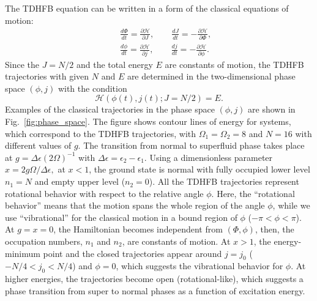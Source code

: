 \documentclass[%
superscriptaddress,
preprint,
showpacs,
nofootinbib,
amsmath,amssymb,
aps,
prc,
floatfix ]%
{revtex4-1}
\begin{document}
The TDHFB equation can be written in a form of
the classical equations of motion:
\begin{eqnarray}
	&&\frac{d\Phi}{dt} = \frac{\partial\mathcal{H}}{\partial J} ,\quad\quad
\frac{dJ}{dt} = -\frac{\partial\mathcal{H}}{\partial \Phi} , \\
	&&\frac{d\phi}{dt} = \frac{\partial\mathcal{H}}{\partial j} ,\quad\quad
\frac{dj}{dt} = -\frac{\partial\mathcal{H}}{\partial \phi} .
\label{TDHFB_equation}
\end{eqnarray}
Since the $J=N/2$ and the total energy $E$ are constants of motion,
the TDHFB trajectories with given $N$ and $E$ are determined
in the two-dimensional phase space $(\phi,j)$ with the condition
\begin{equation}
  \mathcal{H}(\phi(t),j(t);J=N/2) = E.
\end{equation}
Examples of the classical trajectories in the phase space
$(\phi,j)$ are shown in Fig.~\ref{fig:phase_space}.
The figure shows contour lines of energy for systems,
which correspond to the TDHFB trajectories,
with $\Omega_1=\Omega_2=8$ and $N=16$ with different values of $g$.
The transition from normal to superfluid phase takes place at
$g=\Delta\epsilon(2\Omega)^{-1}$ with $\Delta\epsilon=\epsilon_2-\epsilon_1$.
Using a dimensionless parameter
$
  x = 2g\Omega/\Delta\epsilon,
$
at $x<1$, the ground state is normal with fully occupied
lower level $n_1=N$ and empty upper level ($n_2=0$).
All the TDHFB trajectories represent rotational behavior with respect to
the relative angle $\phi$.
Here, the ``rotational behavior'' means that the motion spans the whole
region of the angle $\phi$,
while we use ``vibrational'' for the classical motion in a bound region of
$\phi$ ($-\pi<\phi<\pi$).
At $g=x=0$, the Hamiltonian becomes independent from $(\Phi,\phi)$, then,
the occupation numbers, $n_1$ and $n_2$, are constants of motion.
At $x>1$, the energy-minimum point and the closed trajectories appear around
$j=j_0$ ($-N/4 < j_0 < N/4$) and $\phi=0$,
which suggests the vibrational behavior for $\phi$.
At higher energies, the trajectories become open (rotational-like),
which suggests a phase transition from super to normal phases
as a function of excitation energy.
\end{document}
